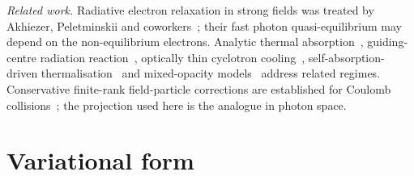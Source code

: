 \documentclass[11pt,a4paper]{article}
\numberwithin{equation}{section}
\begin{document}
\emph{Related work.} Radiative electron relaxation in strong fields was treated
by Akhiezer, Peletminskii and coworkers~\cite{Akh62,Akh63,Pel63}; their fast
photon quasi-equilibrium may depend on the non-equilibrium electrons.
Analytic thermal absorption~\cite{Bertelli05}, guiding-centre radiation
reaction~\cite{Hirvijoki15}, optically thin cyclotron cooling~\cite{Kennedy21},
self-absorption-driven thermalisation~\cite{Ghisellini88} and mixed-opacity
models~\cite{Ochs24a,Ochs24b} address related regimes. Conservative
finite-rank field-particle corrections are established for Coulomb
collisions~\cite{Abel08,Sugama09}; the projection used here is the analogue
in photon space.

\section{Variational form}\label{sec:variational}
\end{document}
